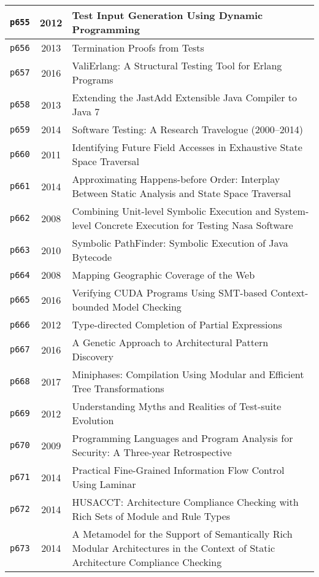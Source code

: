\begin{longtable}{| c | c | p{16cm} |}
  \hline
  \texttt{p655} & 2012 & Test Input Generation Using Dynamic Programming \\
  \hline
  \texttt{p656} & 2013 & Termination Proofs from Tests \\
  \hline
  \texttt{p657} & 2016 & ValiErlang: A Structural Testing Tool for Erlang Programs \\
  \hline
  \texttt{p658} & 2013 & Extending the JastAdd Extensible Java Compiler to Java 7 \\
  \hline
  \texttt{p659} & 2014 & Software Testing: A Research Travelogue (2000--2014) \\
  \hline
  \texttt{p660} & 2011 & Identifying Future Field Accesses in Exhaustive State Space Traversal \\
  \hline
  \texttt{p661} & 2014 & Approximating Happens-before Order: Interplay Between Static Analysis and State Space Traversal \\
  \hline
  \texttt{p662} & 2008 & Combining Unit-level Symbolic Execution and System-level Concrete Execution for Testing Nasa Software \\
  \hline
  \texttt{p663} & 2010 & Symbolic PathFinder: Symbolic Execution of Java Bytecode \\
  \hline
  \texttt{p664} & 2008 & Mapping Geographic Coverage of the Web \\
  \hline
  \texttt{p665} & 2016 & Verifying CUDA Programs Using SMT-based Context-bounded Model Checking \\
  \hline
  \texttt{p666} & 2012 & Type-directed Completion of Partial Expressions \\
  \hline
  \texttt{p667} & 2016 & A Genetic Approach to Architectural Pattern Discovery \\
  \hline
  \texttt{p668} & 2017 & Miniphases: Compilation Using Modular and Efficient Tree Transformations \\
  \hline
  \texttt{p669} & 2012 & Understanding Myths and Realities of Test-suite Evolution \\
  \hline
  \texttt{p670} & 2009 & Programming Languages and Program Analysis for Security: A Three-year Retrospective \\
  \hline
  \texttt{p671} & 2014 & Practical Fine-Grained Information Flow Control Using Laminar \\
  \hline
  \texttt{p672} & 2014 & HUSACCT: Architecture Compliance Checking with Rich Sets of Module and Rule Types \\
  \hline
  \texttt{p673} & 2014 & A Metamodel for the Support of Semantically Rich Modular Architectures in the Context of Static Architecture Compliance Checking \\

\end{longtable}
